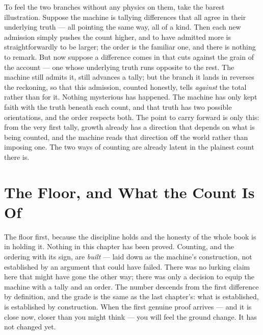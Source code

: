 To feel the two branches without any physics on them, take the barest illustration. Suppose the machine is
tallying differences that all agree in their underlying truth --- all pointing the same way, all of a kind. Then
each new admission simply pushes the count higher, and to have admitted more is straightforwardly to be larger;
the order is the familiar one, and there is nothing to remark. But now suppose a difference comes in that cuts
against the grain of the account --- one whose underlying truth runs opposite to the rest. The machine still
admits it, still advances a tally; but the branch it lands in reverses the reckoning, so that this admission,
counted honestly, tells \emph{against} the total rather than for it. Nothing mysterious has happened. The machine
has only kept faith with the truth beneath each count, and that truth has two possible orientations, and the
order respects both. The point to carry forward is only this: from the very first tally, growth already has a
direction that depends on what is being counted, and the machine reads that direction off the world rather than
imposing one. The two ways of counting are already latent in the plainest count there is.

\section{The Floor, and What the Count Is Of}

The floor first, because the discipline holds and the honesty of the whole book is in holding it. Nothing in this
chapter has been proved. Counting, and the ordering with its sign, are \emph{built} --- laid down as the machine's
construction, not established by an argument that could have failed. There was no lurking claim here that might
have gone the other way; there was only a decision to equip the machine with a tally and an order. The number
descends from the first difference by definition, and the grade is the same as the last chapter's: what is
established, is established by construction. When the first genuine proof arrives --- and it is close now, closer
than you might think --- you will feel the ground change. It has not changed yet.

